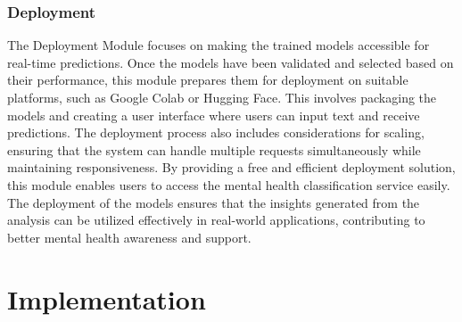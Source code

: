 \subsubsection{Deployment}
\noindent
The Deployment Module focuses on making the trained models accessible for real-time predictions. Once the models have been validated and selected based on their performance, this module prepares them for deployment on suitable platforms, such as Google Colab or Hugging Face. This involves packaging the models and creating a user interface where users can input text and receive predictions. The deployment process also includes considerations for scaling, ensuring that the system can handle multiple requests simultaneously while maintaining responsiveness. By providing a free and efficient deployment solution, this module enables users to access the mental health classification service easily. The deployment of the models ensures that the insights generated from the analysis can be utilized effectively in real-world applications, contributing to better mental health awareness and support.












\section{Implementation}

